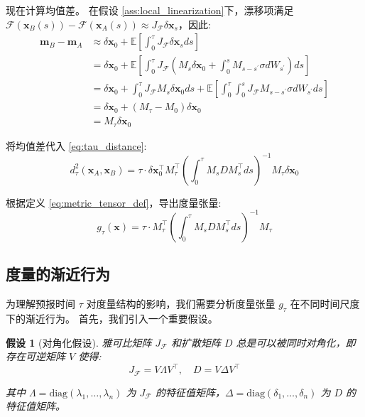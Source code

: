 \documentclass[12pt, a4paper]{article}
\newtheorem{assumption}{假设}[section]
\newcommand{\metric}{g}
\newcommand{\fastvar}{\bm{x}}          %
\newcommand{\drift}{\mathcal{F}}  %
\newcommand{\diffop}{\sigma}      %
\newcommand{\difftensor}{D}       %
\newcommand{\wiener}{W}           %
\newcommand{\jacobian}{J}         %
\newcommand{\fundsol}{M}          %
\newcommand{\predtime}{\tau}      %
\newcommand{\eigenval}{\lambda}         %
\newcommand{\eigenvalmat}{\Lambda}      %
\newcommand{\diffeigenvalmat}{\Delta}   %
\newcommand{\eigenvecmat}{V}            %
\newcommand{\dyndist}{d}                %
\begin{document}
现在计算均值差。
在假设 \ref{ass:local_linearization}下，漂移项满足 $\drift(\fastvar_B(s)) - \drift(\fastvar_A(s)) \approx \jacobian_{\drift} \delta\fastvar_s$，因此:
\begin{align*}
    \bm{m}_B - \bm{m}_A &\approx \delta\fastvar_0 + \mathbb{E}\left[\int_0^{\predtime} \jacobian_{\drift} \delta\fastvar_s ds\right] \\
    &= \delta\fastvar_0 + \mathbb{E}\left[\int_0^{\predtime} \jacobian_{\drift} (\fundsol_s \delta\fastvar_0 + \int_0^s \fundsol_{s-s^\prime} \diffop d\wiener_{s^\prime}) ds\right] \\
    &= \delta\fastvar_0 + \int_0^{\predtime} \jacobian_{\drift} \fundsol_s \delta\fastvar_0 ds + \mathbb{E}\left[\int_0^{\predtime} \int_0^s \jacobian_{\drift} \fundsol_{s-s^\prime} \diffop d\wiener_{s^\prime} ds\right] \\
    &= \delta\fastvar_0 + (\fundsol_{\predtime} - \fundsol_0) \delta\fastvar_0 \\
    &= \fundsol_{\predtime} \delta\fastvar_0
\end{align*}

将均值差代入 \eqref{eq:tau_distance}:
\begin{equation}
\label{eq:tau_distance_final}
    \dyndist_{\predtime}^2(\fastvar_A, \fastvar_B) = \predtime \cdot \delta\fastvar_0^\top \fundsol_{\predtime}^\top \left(\int_0^{\predtime} \fundsol_s \difftensor \fundsol_s^\top ds\right)^{-1} \fundsol_{\predtime} \delta\fastvar_0
\end{equation}

根据定义 \eqref{eq:metric_tensor_def}，导出度量张量:
\begin{equation}
\label{eq:metric_tensor_final}
    \metric_{\predtime}(\fastvar) = \predtime \cdot \fundsol_{\predtime}^\top \left(\int_0^{\predtime} \fundsol_s \difftensor \fundsol_s^\top ds\right)^{-1} \fundsol_{\predtime}
\end{equation}

\subsection{度量的渐近行为}

为理解预报时间 $\predtime$ 对度量结构的影响，我们需要分析度量张量 $\metric_{\predtime}$ 在不同时间尺度下的渐近行为。
首先，我们引入一个重要假设。

\begin{assumption}[对角化假设]
\label{ass:commuting_matrices}
    雅可比矩阵 $\jacobian_{\drift}$ 和扩散矩阵 $\difftensor$ 总是可以被同时对角化，即存在可逆矩阵 $\eigenvecmat$ 使得:
    \begin{equation}
    \label{eq:simultaneous_diagonalization}
        \jacobian_{\drift} = \eigenvecmat\eigenvalmat \eigenvecmat^\top, \quad \difftensor = \eigenvecmat\diffeigenvalmat \eigenvecmat^\top
    \end{equation}

    其中 $\eigenvalmat = \text{diag}(\eigenval_1, \ldots, \eigenval_n)$ 为 $\jacobian_{\drift}$ 的特征值矩阵，$\diffeigenvalmat = \text{diag}(\delta_1, \ldots, \delta_n)$ 为 $\difftensor$ 的特征值矩阵。
\end{assumption}
\end{document}
